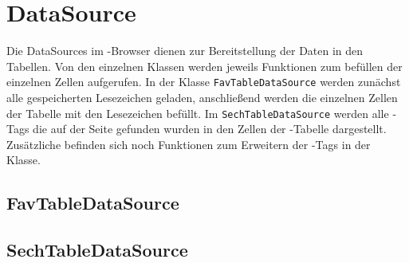 
\section{DataSource}
Die DataSources im \SECH-Browser dienen zur Bereitstellung der Daten in den Tabellen. Von den einzelnen Klassen werden jeweils Funktionen zum befüllen der einzelnen Zellen aufgerufen. In der Klasse \lstinline|FavTableDataSource| werden zunächst alle gespeicherten Lesezeichen geladen, anschließend werden die einzelnen Zellen der Tabelle mit den Lesezeichen befüllt. Im \lstinline|SechTableDataSource| werden alle \SEARCH-Tags die auf der Seite gefunden wurden in den Zellen der \SECH-Tabelle dargestellt. Zusätzliche befinden sich noch Funktionen zum Erweitern der \SEARCH-Tags in der Klasse.

\subsection{FavTableDataSource}
\subsection{SechTableDataSource}


